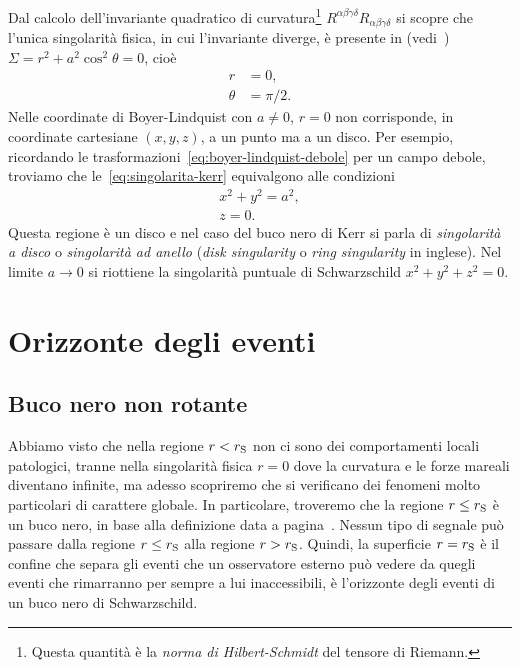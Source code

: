 Dal calcolo dell'invariante quadratico di curvatura\footnote{Questa quantità è
  la \emph{norma di Hilbert-Schmidt} del tensore di Riemann.}
\(R^{\alpha\beta\gamma\delta}R_{\alpha\beta\gamma\delta}\) si scopre che l'unica
singolarità fisica, in cui l'invariante diverge, è presente in
(vedi~\textcite{2007arXiv0706.0622V}) \(\Sigma = r^{2} + a^{2}\cos^{2}\theta =
0\), cioè
\begin{subequations}
  \label{eq:singolarita-kerr}
  \begin{align}
    r &= 0, \\
    \theta &= \pi/2.
  \end{align}
\end{subequations}
Nelle coordinate di Boyer-Lindquist con \(a \neq 0\), \(r = 0\) non corrisponde,
in coordinate cartesiane \((x, y, z)\), a un punto ma a un disco.  Per esempio,
ricordando le trasformazioni~\eqref{eq:boyer-lindquist-debole} per un campo
debole, troviamo che le~\eqref{eq:singolarita-kerr} equivalgono alle condizioni
\begin{subequations}
  \begin{gather}
    x^{2} + y^{2} = a^{2}, \\
    z = 0.
  \end{gather}
\end{subequations}
Questa regione è un disco e nel caso del buco nero di Kerr si parla di
\emph{singolarità a disco} o \emph{singolarità ad anello} (\emph{disk
  singularity} o \emph{ring singularity} in inglese).  Nel limite \(a\to 0\) si
riottiene la singolarità puntuale di Schwarzschild \(x^{2} + y^{2} + z^{2} =
0\).

\section{Orizzonte degli eventi}
\label{sec:orizzonte-eventi}

\subsection{Buco nero non rotante}
\label{sec:orizzonte-schwarzschild}

Abbiamo visto che nella regione \(r < r_{\textup{S}}\) non ci sono dei
comportamenti locali patologici, tranne nella singolarità fisica \(r = 0\) dove
la curvatura e le forze mareali diventano infinite, ma adesso scopriremo che si
verificano dei fenomeni molto particolari di carattere globale.  In particolare,
troveremo che la regione \(r \leq r_{\textup{S}}\) è un buco nero, in base alla
definizione data a pagina~\pageref{definizione-buco-nero}.  Nessun tipo di
segnale può passare dalla regione \(r\leq r_{\textup{S}}\) alla regione \(r >
r_{\textup{S}}\).  Quindi, la superficie \(r = r_{\textup{S}}\) è il confine che
separa gli eventi che un osservatore esterno può vedere da quegli eventi che
rimarranno per sempre a lui inaccessibili, è l'orizzonte degli eventi di un buco
nero di Schwarzschild.


